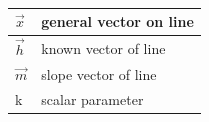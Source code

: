 \begin{table}[H]
    \centering
    \begin{tabular}{|l|l|}
    \hline
      $\vec{x}$   & general vector on line \\
      \hline
      $\vec{h}$   & known vector of line\\
      \hline
      $\vec{m}$ & slope vector of line\\
      \hline
      k &  scalar parameter\\
      \hline
    \end{tabular}
    \caption{}
    \label{tab:tables/table.tex}
\end{table}
